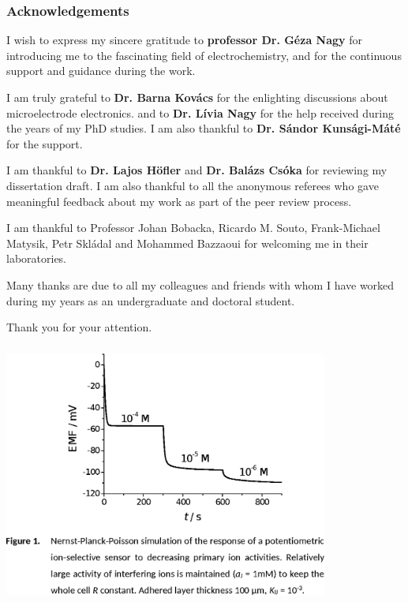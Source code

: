 \documentclass{beamer}
\begin{document}
\begin{frame}
\frametitle{Acknowledgements}
\scriptsize
I wish to express my sincere gratitude to \textbf{professor Dr. Géza Nagy} for introducing me to the fascinating field of electrochemistry, and for the continuous support and guidance during the work.

\vspace{4mm}

I am truly grateful to \textbf{Dr. Barna Kovács} for the enlighting discussions about microelectrode electronics. and to \textbf{Dr. Lívia Nagy} for the help received during the years of my PhD studies. I am also thankful to \textbf{Dr. Sándor Kunsági-Máté} for the support.

\vspace{4mm}

I am thankful to \textbf{Dr. Lajos Höfler} and \textbf{Dr. Balázs Csóka} for reviewing my dissertation draft. I am also thankful to all the anonymous referees who gave meaningful feedback about my work as part of the peer review process.

\vspace{4mm}

I am thankful to Professor Johan Bobacka, Ricardo M. Souto, Frank-Michael Matysik, Petr Skládal and Mohammed Bazzaoui for welcoming me in their laboratories.

\vspace{4mm}

Many thanks are due to all my colleagues and friends with whom I have worked during my years as an undergraduate and doctoral student.

\end{frame}

\begin{frame}
\centering
Thank you for your attention.
\end{frame}


\begin{frame}
	\frametitle{}
	\centering
\includegraphics[width=0.8\textwidth]{HL1.eps}
\end{frame}
\end{document}
